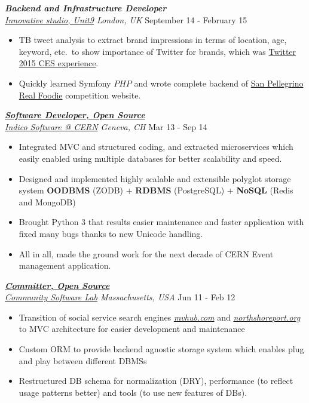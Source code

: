 \documentclass[line, margin]{res}
\begin{document}
\begin{resume}
{\sl \textbf{Backend and Infrastructure Developer} \\ \href{http://www.unit9.com/}{Innovative studio, Unit9} London, UK} \hfill September 14 - February 15 \\
\vspace{-0.3cm}
\begin{itemize}
  \item {} TB tweet analysis to extract brand impressions in terms of location, age, keyword, etc.\ to show importance of Twitter for brands, which was \href{http://www.unit9.com/innovation/twitter-ces-experience}{Twitter 2015 CES experience}.
  \item Quickly learned Symfony \(PHP\) and wrote complete backend of \href{https://realfoodie.sanpellegrino.com/}{San Pellegrino Real Foodie} competition website.
\end{itemize}

{\sl \textbf{\href{http://indico-software.org/}{Software Developer, Open Source}} \\ \href{http://indico.cern.ch/}{Indico Software @ CERN} Geneva, CH} \hfill Mar 13 - Sep 14 \\
\vspace{-0.3cm}
\begin{itemize}
  \item Integrated MVC and structured coding, and extracted microservices which easily enabled using multiple databases for better scalability and speed.
  \item Designed and implemented highly scalable and extensible polyglot storage system \textbf{OODBMS} (ZODB) + \textbf{RDBMS} (PostgreSQL) + \textbf{NoSQL} (Redis and MongoDB)
  \item Brought Python 3 that results easier maintenance and faster application with fixed many bugs thanks to new Unicode handling.
  \item All in all, made the ground work for the next decade of CERN Event management application.
\end{itemize}

{\sl \textbf{\href{https://launchpad.net/mvhub}{Committer, Open Source}} \\ \href{http://thecsl.org/}{Community Software Lab} Massachusetts, USA} \hfill Jun 11 - Feb 12 \\
\vspace{-0.3cm}
\begin{itemize} \itemsep -2pt
  \item Transition of social service search engines \textit{\href{http://mvhub.com/}{mvhub.com}} and \textit{\href{http://northshoreport.org/}{northshoreport.org}} to MVC architecture for easier development and maintenance
  \item Custom ORM to provide backend agnostic storage system which enables plug and play between different DBMSs
  \item Restructured DB schema for normalization (DRY), performance (to reflect usage patterns better) and tools (to use new features of DBs).
\end{itemize}


\end{resume}
\end{document}
